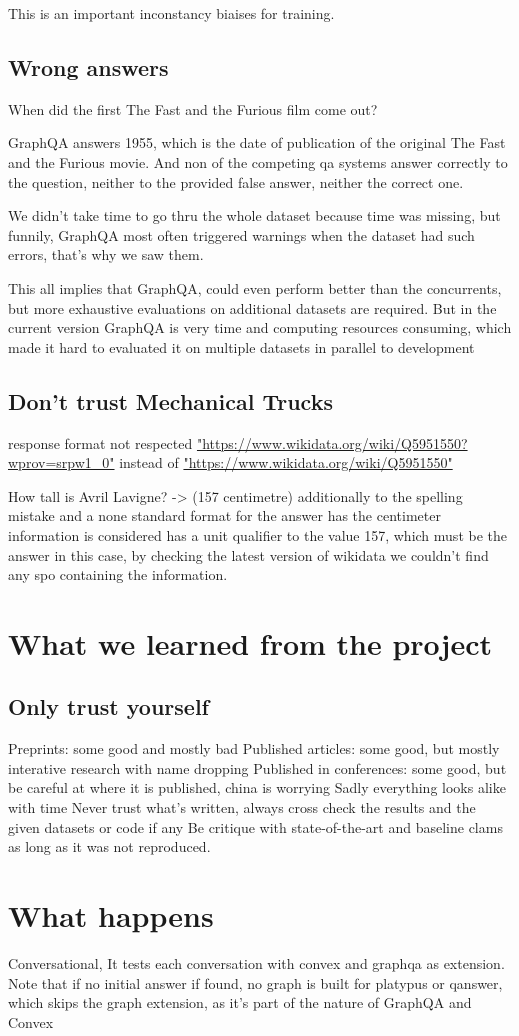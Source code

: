 This is an important inconstancy biaises for training.

\subsection{Wrong answers}
When did the first The Fast and the Furious film come out?

GraphQA answers 1955, which is the date of publication of the original The Fast and the Furious movie. And non of the competing qa systems answer correctly to the question, neither to the provided false answer, neither the correct one.

We didn't take time to go thru the whole dataset because time was missing, but funnily, GraphQA most often triggered warnings when the dataset had such errors, that's why we saw them.

This all implies that GraphQA, could even perform better than the concurrents, but more exhaustive evaluations on additional datasets are required. But in the current version GraphQA is very time and computing resources consuming, which made it hard to evaluated it on multiple datasets in parallel to development 


\subsection{Don't trust Mechanical Trucks}
response format not respected \url{"https://www.wikidata.org/wiki/Q5951550?wprov=srpw1\_0"} instead of \url{"https://www.wikidata.org/wiki/Q5951550"}

How tall is Avril Lavigne? -> (157 centimetre) additionally to the spelling mistake and a none standard format for the answer has the centimeter information is considered has a unit qualifier to the value 157, which must be the answer in this case, by checking the latest version of wikidata we couldn't find any spo containing the information.


\section{What we learned from the project}
\subsection{Only trust yourself}
Preprints: some good and mostly bad
Published articles: some good, but mostly interative research with name dropping
Published in conferences: some good, but be careful at where it is published, china is worrying
Sadly everything looks alike with time
Never trust what's written, always cross check the results and the given datasets or code if any
Be critique with state-of-the-art and baseline clams as long as it was not reproduced.



\section{What happens}

Conversational,
It tests each conversation with convex and graphqa as extension.
Note that if no initial answer if found, no graph is built for platypus or qanswer, which skips the graph extension, as it's part of the nature of GraphQA and Convex



